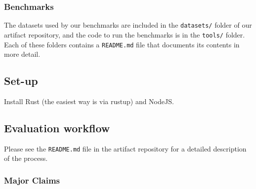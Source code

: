 \documentclass[sigplan,10pt]{acmart}
\begin{document}
\subsubsection{Benchmarks}

The datasets used by our benchmarks are included in the \texttt{datasets/} folder of our artifact repository, and the code to run the benchmarks is in the \texttt{tools/} folder.
Each of these folders contains a \texttt{README.md} file that documents its contents in more detail.

\subsection{Set-up}

Install Rust (the easiest way is via rustup) and NodeJS.

\subsection{Evaluation workflow}

Please see the \texttt{README.md} file in the artifact repository for a detailed description of the process.

\subsubsection{Major Claims}




\end{document}
